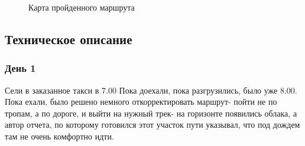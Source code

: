 \documentclass[]{article}
\begin{document}
\begin{figure}[h!] 
	
	\caption{Карта пройденного маршрута }
	\label{map_all}
\end{figure}



\subsection{Техническое описание}
	
\subsubsection{День 1}
Сели в заказанное такси в 7.00
Пока доехали, пока разгрузились, было уже 8.00. Пока ехали, было решено немного откорректировать маршрут- пойти не по тропам, а по дороге, и выйти на нужный трек- на горизонте появились облака, а автор отчета, по которому готовился этот участок пути указывал, что под дождем там не очень комфортно идти.
\end{document}
